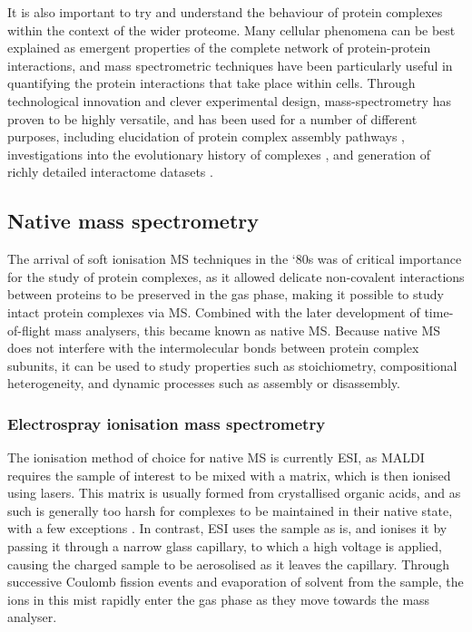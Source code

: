 \documentclass[a4paper,11pt,twoside,openright]{scrbook}
\begin{document}
It is also important to try and understand the behaviour of protein complexes within the context of the wider proteome. Many cellular phenomena can be best explained as emergent properties of the complete network of protein-protein interactions, and mass spectrometric techniques have been particularly useful in quantifying the protein interactions that take place within cells. Through technological innovation and clever experimental design, mass-spectrometry has proven to be highly versatile, and has been used for a number of different purposes, including elucidation of protein complex assembly pathways \cite{Levy2008,Marsh2013}, investigations into the evolutionary history of complexes \cite{Wan2015}, and generation of richly detailed interactome datasets \cite{Hein2015}.

\subsection{Native mass spectrometry}
The arrival of soft ionisation MS techniques in the `80s was of critical importance for the study of protein complexes, as it allowed delicate non-covalent interactions between proteins to be preserved in the gas phase, making it possible to study intact protein complexes via MS. Combined with the later development of time-of-flight mass analysers, this became known as native MS. Because native MS does not interfere with the intermolecular bonds between protein complex subunits, it can be used to study properties such as stoichiometry, compositional heterogeneity, and dynamic processes such as assembly or disassembly.

\subsubsection{Electrospray ionisation mass spectrometry}
The ionisation method of choice for native MS is currently ESI, as MALDI requires the sample of interest to be mixed with a matrix, which is then ionised using lasers. This matrix is usually formed from crystallised organic acids, and as such is generally too harsh for complexes to be maintained in their native state, with a few exceptions \cite{Song2007}. In contrast, ESI uses the sample as is, and ionises it by passing it through a narrow glass capillary, to which a high voltage is applied, causing the charged sample to be aerosolised as it leaves the capillary. Through successive Coulomb fission events and evaporation of solvent from the sample, the ions in this mist rapidly enter the gas phase as they move towards the mass analyser.
\end{document}

